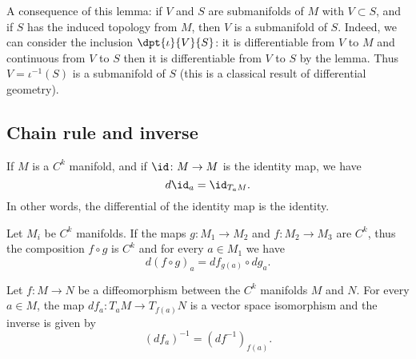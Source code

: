 A consequence of this lemma: if $V$ and $S$ are submanifolds of $M$ with $V\subset S$, and if $S$ has the induced topology from $M$, then $V$ is a submanifold of $S$. Indeed, we can consider the inclusion $\dpt{\iota}{V}{S}$: it is differentiable from $V$ to $M$ and continuous from $V$ to $S$ then it is differentiable from $V$ to $S$ by the lemma. Thus $V=\iota^{-1}(S)$ is a submanifold of $S$ (this is a classical result of differential geometry).

\subsection{Chain rule and inverse}

\begin{lemma}       \label{LEMooEGITooXbAPDe}
	If \( M\) is a \( C^k\) manifold, and if \( \id\colon M\to M\) is the identity map, we have
	\begin{equation}
		d\id_a=\id_{T_aM}.
	\end{equation}
	In other words, the differential of the identity map is the identity.
\end{lemma}

\begin{lemma}       \label{LEMooGRRAooXxDMuw}
	Let \( M_i\) be \( C^k\) manifolds. If the maps \( g\colon M_1\to M_2\) and \( f\colon M_2\to M_3 \) are \( C^k\), thus the composition \( f\circ g\) is \( C^k\) and for every \( a\in M_1\) we have
	\begin{equation}
		d(f\circ g)_a=df_{g(a)}\circ dg_a.
	\end{equation}
\end{lemma}


\begin{proposition}       \label{PROPooPEMLooPQcywG}
	Let \( f\colon M\to N\) be a diffeomorphism between the \( C^k\) manifolds \( M\) and \( N\). For every \( a\in M\), the map \( df_a\colon T_aM\to T_{f(a)}N\) is a vector space isomorphism and the inverse is given by
	\begin{equation}
		(df_a)^{-1}=(df^{-1})_{f(a)}.
	\end{equation}
\end{proposition}

